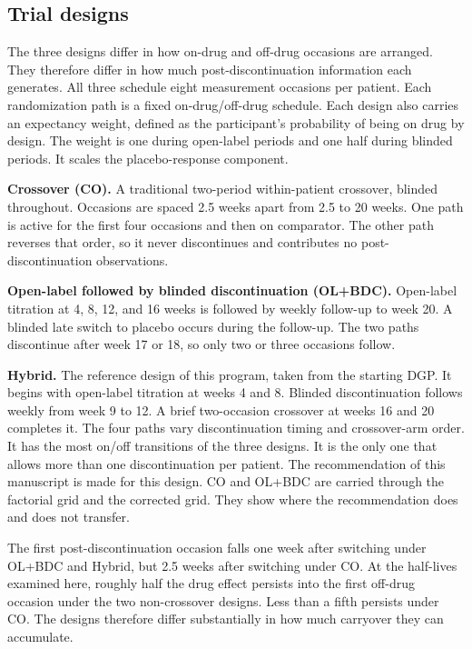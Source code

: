 \documentclass[
  11pt,
]{article}
\begin{document}
\subsection{Trial designs}\label{sec-designs}

The three designs differ in how on-drug and off-drug occasions are
arranged. They therefore differ in how much post-discontinuation
information each generates. All three schedule eight measurement
occasions per patient. Each randomization path is a fixed
on-drug/off-drug schedule. Each design also carries an expectancy
weight, defined as the participant's probability of being on drug
by design. The weight is one during open-label periods and one half
during blinded periods. It scales the placebo-response component.

\textbf{Crossover (CO).} A traditional two-period within-patient
crossover, blinded throughout. Occasions are spaced 2.5 weeks apart
from 2.5 to 20 weeks. One path is active for the first four
occasions and then on comparator. The other path reverses that
order, so it never discontinues and contributes no
post-discontinuation observations.

\textbf{Open-label followed by blinded discontinuation (OL+BDC).}
Open-label titration at 4, 8, 12, and 16 weeks is followed by weekly
follow-up to week 20. A blinded late switch to placebo occurs during
the follow-up. The two paths discontinue after week 17 or 18, so only
two or three occasions follow.

\textbf{Hybrid.} The reference design of this program, taken from the
starting DGP. It begins with open-label titration at weeks 4 and 8.
Blinded discontinuation follows weekly from week 9 to 12. A brief
two-occasion crossover at weeks 16 and 20 completes it. The four
paths vary discontinuation timing and crossover-arm order. It has the most
on/off transitions of the three designs. It is the only one that
allows more than one discontinuation per patient. The recommendation
of this manuscript is made for this design. CO and OL+BDC are
carried through the factorial grid and the corrected grid. They show
where the recommendation does and does not transfer.

The first post-discontinuation occasion falls one week after
switching under OL+BDC and Hybrid, but 2.5 weeks after switching
under CO. At the
half-lives examined here, roughly half the drug effect persists into
the first off-drug occasion under the two non-crossover designs. Less
than a fifth persists under CO. The designs therefore differ
substantially in how much carryover they can accumulate.
\end{document}
